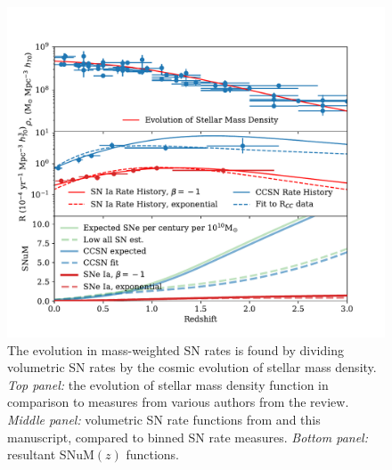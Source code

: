 \documentclass[apj, twocolumn]{aastex62}
\begin{document}
\begin{figure}[h] 
   \centering
   \includegraphics[width=6.5in]{SNuM_all.pdf}
   \caption{\footnotesize The evolution in mass-weighted SN rates is found by dividing volumetric SN rates by the cosmic evolution of stellar mass density. \textit{Top panel:} the evolution of stellar mass density function in comparison to measures from various authors from the \cite{Madau:2014fk} review. \textit{Middle panel:} volumetric SN rate functions from \cite{Strolger:2015aa} and this manuscript, compared to binned SN rate measures.  \textit{Bottom panel:} resultant SNuM$(z)$ functions.}
   \label{fig:SNuM}
\end{figure}
\end{document}
